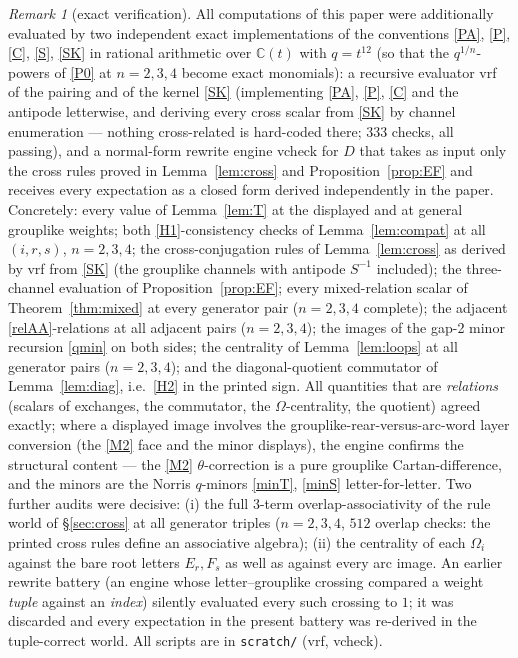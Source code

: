 \documentclass[11pt]{article}
\theoremstyle{definition}
\theoremstyle{remark}
\newtheorem{remark}[theorem]{Remark}
\newcommand{\C}{\mathbb{C}}
\newcommand{\tht}{\theta}
\begin{document}
\begin{remark}[exact verification]\label{rem:verify}
All computations of this paper were additionally evaluated by two
independent exact implementations of the conventions
\eqref{PA}, \eqref{P}, \eqref{C}, \eqref{S}, \eqref{SK} in rational
arithmetic over $\C(t)$ with $q=t^{12}$ (so that the $q^{1/n}$-powers
of \eqref{P0} at $n=2,3,4$ become exact monomials): a recursive
evaluator \textsf{vrf} of the pairing and of the kernel \eqref{SK}
(implementing \eqref{PA}, \eqref{P}, \eqref{C} and the antipode
letterwise, and deriving every cross scalar from \eqref{SK} by
channel enumeration --- nothing cross-related is hard-coded there;
333 checks, all passing), and a normal-form rewrite engine
\textsf{vcheck} for $D$ that takes as input only the cross rules
proved in Lemma~\ref{lem:cross} and Proposition~\ref{prop:EF} and
receives every expectation as a closed form derived independently in
the paper.  Concretely: every value of
Lemma~\ref{lem:T} at the displayed and at general grouplike weights;
both \eqref{H1}-consistency checks of Lemma~\ref{lem:compat} at all
$(i,r,s)$, $n=2,3,4$; the cross-conjugation rules of
Lemma~\ref{lem:cross} as derived by \textsf{vrf} from \eqref{SK}
(the grouplike channels with antipode $S^{-1}$ included); the
three-channel evaluation of
Proposition~\ref{prop:EF}; every mixed-relation scalar of
Theorem~\ref{thm:mixed} at every generator pair ($n=2,3,4$
complete); the adjacent
\eqref{relAA}-relations at all adjacent pairs ($n=2,3,4$); the
images of the gap-2 minor recursion \eqref{qmin} on both sides;
the centrality of Lemma~\ref{lem:loops} at all generator pairs
($n=2,3,4$); and the diagonal-quotient commutator of
Lemma~\ref{lem:diag}, i.e.\ \eqref{H2} in the printed sign.  All
quantities that are \emph{relations} (scalars of exchanges, the
commutator, the $\Omega$-centrality, the quotient) agreed exactly;
where a displayed image involves the
grouplike-rear-versus-arc-word layer conversion (the \eqref{M2} face
and the minor displays), the engine confirms the structural content
— the \eqref{M2} $\tht$-correction is a pure grouplike
Cartan-difference, and the minors are the Norris $q$-minors
\eqref{minT}, \eqref{minS} letter-for-letter.  Two further audits
were decisive: (i) the full $3$-term overlap-associativity of the
rule world of \S\ref{sec:cross} at all generator triples ($n=2,3,4$,
$512$ overlap checks: the printed cross rules define an associative
algebra);
(ii) the centrality of each $\Omega_i$ against the bare root letters
$E_r,F_s$ as well as against every arc image.  An earlier rewrite
battery (an engine whose letter--grouplike crossing compared a
weight \emph{tuple} against an \emph{index}) silently evaluated every
such crossing to $1$; it was discarded and every expectation in the
present battery was re-derived in the tuple-correct world.  All
scripts are in \texttt{scratch/} (\textsf{vrf}, \textsf{vcheck}).
\end{remark}
\end{document}
